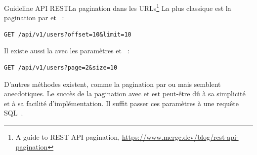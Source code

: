 \documentclass{beamer}
\begin{document}
    \begin{frame}[fragile]{Guideline API REST}{La pagination dans les URLs\footnote{A guide to REST API pagination, \url{https://www.merge.dev/blog/rest-api-pagination}}}
        La plus classique est la pagination par  et ~:
        \begin{lstlisting}
GET /api/v1/users?offset=10&limit=10
        \end{lstlisting}
        \bigbreak
        Il existe aussi la  avec les paramètres  et ~:
        \begin{lstlisting}
GET /api/v1/users?page=2&size=10
        \end{lstlisting}
        \bigbreak
        D'autres méthodes existent, comme la pagination par  ou  mais semblent anecdotiques.
        \bigbreak
        Le succès de la pagination avec  et  est peut-être dû à sa simplicité et à sa facilité d'implémentation.
        Il suffit passer ces paramètres à une requête SQL~.
    \end{frame}
\end{document}
